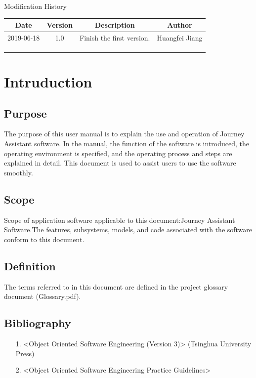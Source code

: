 \documentclass[10pt]{article}
\begin{document}
\newpage

\begin{center}
    {\LARGE Modification History}
    
    \begin{tabular}{|c|c|c|c|} 
        \hline 
        Date&Version&Description&Author\\
        \hline  
        2019-06-18&1.0&Finish the first version.&Huangfei Jiang\\
		\hline 
		& & & \\
		\hline
		& & & \\
		\hline
		& & & \\
		\hline
    \end{tabular}    
\end{center}

\newpage

\tableofcontents
\newpage

\section{Intruduction}
\subsection{Purpose}
The purpose of this user manual is to explain the use and operation of Journey Assistant software. In the manual, the function of the software is introduced, the operating environment is specified, and the operating process and steps are explained in detail. This document is used to assist users to use the software smoothly.

\subsection{Scope}
Scope of application software applicable to this document:Journey Assistant Software.The features, subsystems, models, and code associated with the software conform to this document.

\subsection{Definition}
The terms referred to in this document are defined in the project glossary document (Glossary.pdf).

\subsection{Bibliography}
\begin{itemize}
	\item[1.] <Object Oriented Software Engineering (Version 3)> (Tsinghua University Press)
	\item[2.] <Object Oriented Software Engineering Practice Guidelines> 
\end{itemize}
\end{document}
